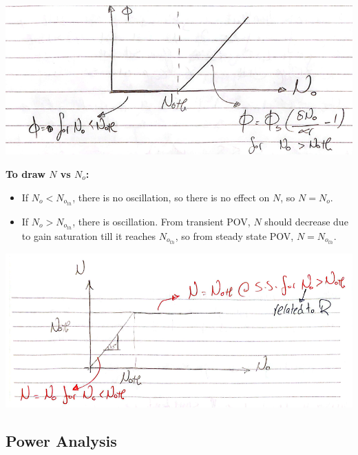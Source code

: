 \documentclass[11pt]{article}
\begin{document}
\begin{center}
    \includegraphics[scale=0.8]{7.png}
\end{center}
\textbf{To draw $N$ vs $N_o$:}
\begin{itemize}
    \item If $N_o < N_{o_{th}}$, there is no oscillation, so there is no effect on $N$, so $N = N_o$.
    \item If $N_o > N_{o_{th}}$, there is oscillation. From transient POV, $N$ should decrease due to gain saturation till it reaches $N_{o_{th}}$, so from steady state POV, $N = N_{o_{th}}$.
\end{itemize}
\begin{center}
    \includegraphics[scale=0.8]{8.png}
\end{center}

\subsection{Power Analysis}
\end{document}
